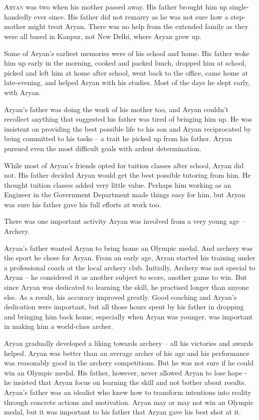\chapter{}

\lettrine{A}{ryan} was two when his mother passed away. His father brought him up
single-handedly ever since. His father did not remarry as he was not sure how a
step-mother might treat Aryan. There was no help from the extended family as
they were all based in Kanpur, not New Delhi, where Aryan grew up.

Some of Aryan's earliest memories were of his school and home. His father woke
him up early in the morning, cooked and packed lunch, dropped him at school,
picked and left him at home after school, went back to the office, came home at
late-evening, and helped Aryan with his studies. Most of the days he slept
early, with Aryan.

Aryan's father was doing the work of his mother too, and Aryan couldn't
recollect anything that suggested his father was tired of bringing him up. He
was insistent on providing the best possible life to his son and Aryan
reciprocated by being committed to his tasks – a trait he picked up from his
father. Aryan pursued even the most difficult goals with ardent determination.

While most of Aryan's friends opted for tuition classes after school, Aryan did
not. His father decided Aryan would get the best possible tutoring from him. He
thought tuition classes added very little value. Perhaps him working as an
Engineer in the Government Department made things easy for him, but Aryan was
sure his father gave his full efforts at work too.

There was one important activity Aryan was involved from a very young age –
Archery.

Aryan's father wanted Aryan to bring home an Olympic medal. And archery was the
sport he chose for Aryan. From an early age, Aryan started his training under a
professional coach at the local archery club. Initially, Archery was not special
to Aryan – he considered it as another subject to score, another game to win.
But since Aryan was dedicated to learning the skill, he practised longer than
anyone else. As a result, his accuracy improved greatly. Good coaching and
Aryan's dedication were important, but all those hours spent by his father in
dropping and bringing him back home, especially when Aryan was younger, was
important in making him a world-class archer.

Aryan gradually developed a liking towards archery – all his victories and
awards helped. Aryan was better than an average archer of his age and his
performance was reasonably good in the archery competitions. But he was not sure
if he could win an Olympic medal. His father, however, never allowed Aryan to
lose hope - he insisted that Aryan focus on learning the skill and not bother
about results. Aryan's father was an idealist who knew how to transform
intentions into reality through concrete actions and motivation. Aryan may or may
not win an Olympic medal, but it was important to his father that Aryan gave his
best shot at it.

